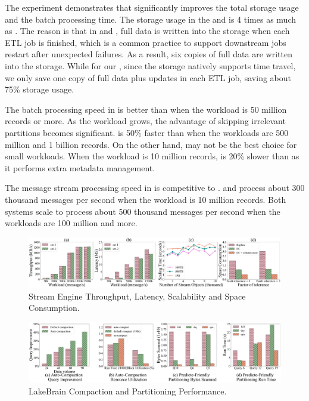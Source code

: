 The experiment demonstrates that \sys significantly improves the total storage usage and the batch processing time. The storage usage in the \hdfs and \kafka  is 4 times as much as \sys. The reason is that in \hdfs and \kafka, full data is written into the storage when each ETL job is finished, which is a common practice to support downstream jobs restart after unexpected failures. As a result, six copies of full data are written into the storage. While for our \sys, since the storage natively supports time travel, we only save one copy of full data plus updates in each ETL job, saving about 75\% storage usage.


The batch processing speed in \sys is better than \hdfs when the workload is 50 million records or more.  As the workload grows, the advantage of skipping irrelevant partitions becomes significant. \sys is 50\% faster than \hdfs when the workloads are 500 million and 1 billion records. On the other hand, \sys may not be the best choice for small workloads. When the workload is 10 million records, \sys is 20\% slower than \hdfs as it performs extra metadata management.





The message stream processing speed in \sys is competitive to \kafka. \sys and \kafka process about 300 thousand messages per second when the workload is 10 million records. Both systems scale to process about 500 thousand messages per second when the workloads are 100 million and more. 

\begin{figure}
	\centering
	\includegraphics[width=\textwidth]{figures/streamengine}
	\caption{Stream Engine Throughput, Latency, Scalability and Space Consumption.}
	\label{fig:streamengine}
\end{figure}



\begin{figure}
	\centering
	\includegraphics[width=\textwidth]{figures/LakeBrain}
	\caption{LakeBrain Compaction and Partitioning Performance.}
	\label{fig:lakebrain}
\end{figure}



